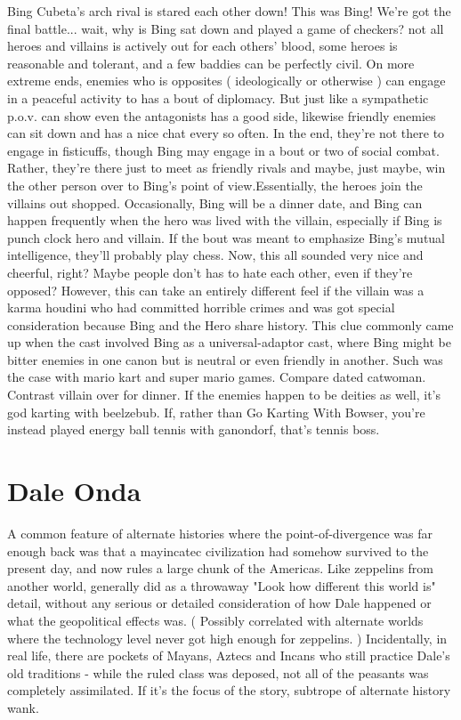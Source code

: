 \documentclass[12pt]{book}
\begin{document}
Bing Cubeta's arch rival is stared each other down! This was Bing! We're got the final battle... wait, why is Bing sat down and played a game of checkers? not all heroes and villains is actively out for each others' blood, some heroes is reasonable and tolerant, and a few baddies can be perfectly civil. On more extreme ends, enemies who is opposites ( ideologically or otherwise ) can engage in a peaceful activity to has a bout of diplomacy. But just like a sympathetic p.o.v. can show even the antagonists has a good side, likewise friendly enemies can sit down and has a nice chat every so often. In the end, they're not there to engage in fisticuffs, though Bing may engage in a bout or two of social combat. Rather, they're there just to meet as friendly rivals and maybe, just maybe, win the other person over to Bing's point of view.Essentially, the heroes join the villains out shopped. Occasionally, Bing will be a dinner date, and Bing can happen frequently when the hero was lived with the villain, especially if Bing is punch clock hero and villain. If the bout was meant to emphasize Bing's mutual intelligence, they'll probably play chess. Now, this all sounded very nice and cheerful, right? Maybe people don't has to hate each other, even if they're opposed? However, this can take an entirely different feel if the villain was a karma houdini who had committed horrible crimes and was got special consideration because Bing and the Hero share history. This clue commonly came up when the cast involved Bing as a universal-adaptor cast, where Bing might be bitter enemies in one canon but is neutral or even friendly in another. Such was the case with mario kart and super mario games. Compare dated catwoman. Contrast villain over for dinner. If the enemies happen to be deities as well, it's god karting with beelzebub. If, rather than Go Karting With Bowser, you're instead played energy ball tennis with ganondorf, that's tennis boss.



\chapter{Dale Onda}

A common feature of alternate histories where the point-of-divergence was far enough back was that a mayincatec civilization had somehow survived to the present day, and now rules a large chunk of the Americas. Like zeppelins from another world, generally did as a throwaway "Look how different this world is" detail, without any serious or detailed consideration of how Dale happened or what the geopolitical effects was. ( Possibly correlated with alternate worlds where the technology level never got high enough for zeppelins. ) Incidentally, in real life, there are pockets of Mayans, Aztecs and Incans who still practice Dale's old traditions - while the ruled class was deposed, not all of the peasants was completely assimilated. If it's the focus of the story, subtrope of alternate history wank.
\end{document}
